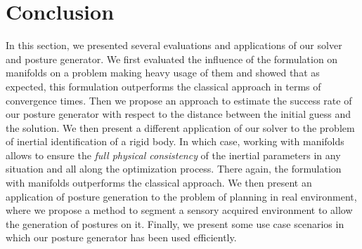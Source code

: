 \section{Conclusion}
\label{sec:conclusion_chap_6}

In this section, we presented several evaluations and applications of our solver and posture generator.
We first evaluated the influence of the formulation on manifolds on a problem making heavy usage of them and showed that as expected, this formulation outperforms the classical approach in terms of convergence times.
Then we propose an approach to estimate the success rate of our posture generator with respect to the distance between the initial guess and the solution.
We then present a different application of our solver to the problem of inertial identification of a rigid body.
In which case, working with manifolds allows to ensure the \emph{full physical consistency} of the inertial parameters in any situation and all along the optimization process.
There again, the formulation with manifolds outperforms the classical approach.
We then present an application of posture generation to the problem of planning in real environment, where we propose a method to segment a sensory acquired environment to allow the generation of postures on it.
Finally, we present some use case scenarios in which our posture generator has been used efficiently.
